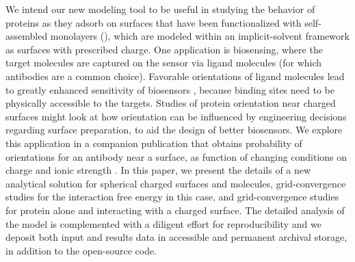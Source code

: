 We intend our new modeling tool to be useful in studying the behavior of proteins as they adsorb on surfaces that have been functionalized with  self-assembled monolayers (\sam), which are modeled within an implicit-solvent framework as surfaces with prescribed charge. 
One application is biosensing, where the target molecules are captured on the sensor via ligand molecules (for which antibodies are a common choice). Favorable orientations of ligand molecules lead to greatly enhanced sensitivity of biosensors \cite{TajimaTakaiIshihara2011,TrillingBeekwilderZuilhof2013}, because binding sites need to be physically accessible to the targets. Studies of protein orientation near charged surfaces might look at how orientation can be influenced by engineering decisions regarding surface preparation, to aid the design of better biosensors. We explore this application in a companion publication that obtains probability of orientations for an antibody near a surface, as function of changing conditions on charge and ionic strength \cite{CooperClementiBarba2015}. 
In this paper, we present the details of a new analytical solution for spherical charged surfaces and molecules, grid-convergence studies for the interaction free energy in this case, and grid-convergence studies for protein \gb alone and interacting with a charged surface. The detailed analysis of the model is complemented with a diligent effort for reproducibility and we deposit both input and results data in accessible and permanent archival storage, in addition to the open-source code.
